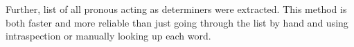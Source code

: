 \documentclass{report}
\begin{document}
Further, list of all pronous acting as determiners were extracted. This method is
both faster and more reliable than just going through the list by hand and using
intraspection or manually looking up each word.



%
%
%
%
%
\end{document}
